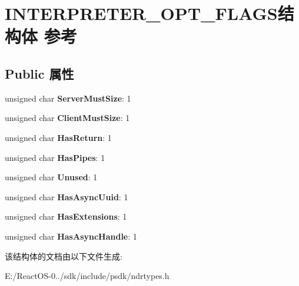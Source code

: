 \hypertarget{struct_i_n_t_e_r_p_r_e_t_e_r___o_p_t___f_l_a_g_s}{}\section{I\+N\+T\+E\+R\+P\+R\+E\+T\+E\+R\+\_\+\+O\+P\+T\+\_\+\+F\+L\+A\+G\+S结构体 参考}
\label{struct_i_n_t_e_r_p_r_e_t_e_r___o_p_t___f_l_a_g_s}
\subsection*{Public 属性}
\begin{DoxyCompactItemize}
\item 
\mbox{\label{struct_i_n_t_e_r_p_r_e_t_e_r___o_p_t___f_l_a_g_s_a2e4cc7fc3f48130f13abb468d9cd263f}} 
unsigned char {\bfseries Server\+Must\+Size}\+: 1
\item 
\mbox{\label{struct_i_n_t_e_r_p_r_e_t_e_r___o_p_t___f_l_a_g_s_a8962569ba5c810b0eda5933deeffe9d6}} 
unsigned char {\bfseries Client\+Must\+Size}\+: 1
\item 
\mbox{\label{struct_i_n_t_e_r_p_r_e_t_e_r___o_p_t___f_l_a_g_s_a902a67e3c0e8f143b072e0385b32d271}} 
unsigned char {\bfseries Has\+Return}\+: 1
\item 
\mbox{\label{struct_i_n_t_e_r_p_r_e_t_e_r___o_p_t___f_l_a_g_s_ab13e2dedaa34412c7b968b92d7b41362}} 
unsigned char {\bfseries Has\+Pipes}\+: 1
\item 
\mbox{\label{struct_i_n_t_e_r_p_r_e_t_e_r___o_p_t___f_l_a_g_s_ac3958d11183b5ea834c64d9c4684e0d8}} 
unsigned char {\bfseries Unused}\+: 1
\item 
\mbox{\label{struct_i_n_t_e_r_p_r_e_t_e_r___o_p_t___f_l_a_g_s_af618399fdba0700cecc75d56ee90362e}} 
unsigned char {\bfseries Has\+Async\+Uuid}\+: 1
\item 
\mbox{\label{struct_i_n_t_e_r_p_r_e_t_e_r___o_p_t___f_l_a_g_s_a8e940a50f8c6408801704d013c03a1e0}} 
unsigned char {\bfseries Has\+Extensions}\+: 1
\item 
\mbox{\label{struct_i_n_t_e_r_p_r_e_t_e_r___o_p_t___f_l_a_g_s_a723aa769f9e75be36d0a2ac162a64277}} 
unsigned char {\bfseries Has\+Async\+Handle}\+: 1
\end{DoxyCompactItemize}


该结构体的文档由以下文件生成\+:\begin{DoxyCompactItemize}
\item 
E\+:/\+React\+O\+S-\/0../sdk/include/psdk/ndrtypes.\+h\end{DoxyCompactItemize}
